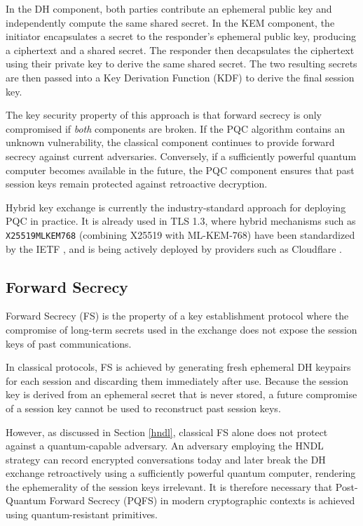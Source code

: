 In the DH component, both parties contribute an ephemeral public key and independently compute the same shared secret. In the KEM component, the initiator encapsulates a secret to the responder's ephemeral public key, producing a ciphertext and a shared secret. The responder then decapsulates the ciphertext using their private key to derive the same shared secret. The two resulting secrets are then passed into a Key Derivation Function (KDF) to derive the final session key. 

The key security property of this approach is that forward secrecy is only compromised if \textit{both} components are broken. If the PQC algorithm contains an unknown vulnerability, the classical component continues to provide forward secrecy against current adversaries. Conversely, if a sufficiently powerful quantum computer becomes available in the future, the PQC component ensures that past session keys remain protected against retroactive decryption.

Hybrid key exchange is currently the industry-standard approach for deploying PQC in practice. It is already used in TLS 1.3, where hybrid mechanisms such as \texttt{X25519MLKEM768} (combining X25519 with ML-KEM-768) have been standardized by the IETF \cite{ietf-tls-ecdhe-mlkem-04}, and is being actively deployed by providers such as Cloudflare \cite{Westerbaan2025PQ}.

\subsection{Forward Secrecy}\label{sec:forward_secrecy}
Forward Secrecy (FS) is the property of a key establishment protocol where the compromise of long-term secrets used in the exchange does not expose the session keys of past communications. 

In classical protocols, FS is achieved by generating fresh ephemeral DH keypairs for each session and discarding them immediately after use. Because the session key is derived from an ephemeral secret that is never stored, a future compromise of a session key cannot be used to reconstruct past session keys.

However, as discussed in Section \ref{hndl}, classical FS alone does not protect against a quantum-capable adversary. An adversary employing the HNDL strategy can record encrypted conversations today and later break the DH exchange retroactively using a sufficiently powerful quantum computer, rendering the ephemerality of the session keys irrelevant. It is therefore necessary that Post-Quantum Forward Secrecy (PQFS) in modern cryptographic contexts is achieved using quantum-resistant primitives. 

